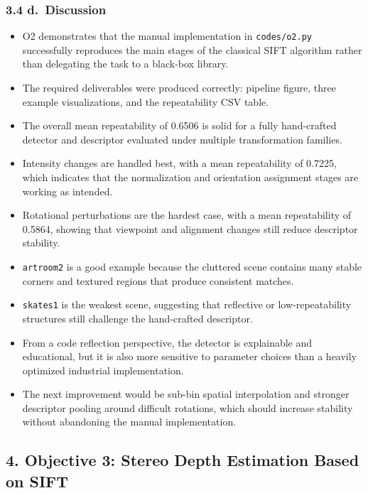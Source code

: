 \documentclass[
  11pt,
]{article}
\providecommand{\tightlist}{%
  \setlength{\itemsep}{0pt}\setlength{\parskip}{0pt}}
\begin{document}
\subsubsection{3.4 d.~Discussion}\label{d.-discussion-1}

\begin{itemize}
\tightlist
\item
  O2 demonstrates that the manual implementation in \texttt{codes/o2.py}
  successfully reproduces the main stages of the classical SIFT
  algorithm rather than delegating the task to a black-box library.
\item
  The required deliverables were produced correctly: pipeline figure,
  three example visualizations, and the repeatability CSV table.
\item
  The overall mean repeatability of 0.6506 is solid for a fully
  hand-crafted detector and descriptor evaluated under multiple
  transformation families.
\item
  Intensity changes are handled best, with a mean repeatability of
  0.7225, which indicates that the normalization and orientation
  assignment stages are working as intended.
\item
  Rotational perturbations are the hardest case, with a mean
  repeatability of 0.5864, showing that viewpoint and alignment changes
  still reduce descriptor stability.
\item
  \texttt{artroom2} is a good example because the cluttered scene
  contains many stable corners and textured regions that produce
  consistent matches.
\item
  \texttt{skates1} is the weakest scene, suggesting that reflective or
  low-repeatability structures still challenge the hand-crafted
  descriptor.
\item
  From a code reflection perspective, the detector is explainable and
  educational, but it is also more sensitive to parameter choices than a
  heavily optimized industrial implementation.
\item
  The next improvement would be sub-bin spatial interpolation and
  stronger descriptor pooling around difficult rotations, which should
  increase stability without abandoning the manual implementation.
\end{itemize}

\subsection{4. Objective 3: Stereo Depth Estimation Based on
SIFT}\label{objective-3-stereo-depth-estimation-based-on-sift}
\end{document}
